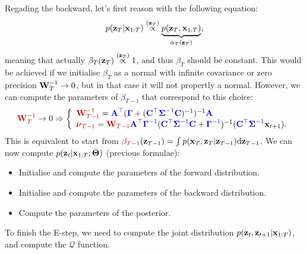  \noindent Regading the backward, let's first reason with the following equation:
 \begin{equation}
  p(\boldsymbol{\mathbf{z}}_T|\boldsymbol{\mathbf{x}}_{1:T}) \stackrel{(\boldsymbol{\mathbf{z}}_T)}{\propto} \underbrace{p(\boldsymbol{\mathbf{z}}_T,\boldsymbol{\mathbf{x}}_{1:T})}_{\alpha_T(\boldsymbol{\mathbf{z}}_T)},
 \end{equation}
meaning that actually $\beta_T(\boldsymbol{\mathbf{z}}_T)\stackrel{(\boldsymbol{\mathbf{z}}_T)}{\propto} 1$, and thus $\beta_T$ should be constant. This would be achieved if we initialise $\beta_T$ as a normal with infinite covariance or zero precision $\boldsymbol{\mathbf{W}}_T^{-1}\rightarrow 0$, but in that case it will not propertly a normal. However, we can compute the parameters of $\beta_{T-1}$ that correspond to this choice:
\begin{equation*}
  \paint{myred}{\bs{W}_T^{-1}}\rightarrow 0 \Rightarrow \left\{\begin{array}{l}
  \paint{myred}{\bs{W}_{T-1}^{-1}} = \paint{myblue}{\bs{A}^\top}(\paint{myblue}{\bs{\Gamma}} + (\paint{myblue}{\bs{C}^\top}\paint{myblue}{\bs{\Sigma}^{-1}}\paint{myblue}{\bs{C}})^{-1})^{-1}\paint{myblue}{\bs{A}} \\
  \paint{myred}{\boldsymbol{\nu}_{T-1}} = \paint{myred}{\bs{W}_{T-1}} \paint{myblue}{\bs{A}^\top}\paint{myblue}{\bs{\Gamma}^{-1}}(\paint{myblue}{\bs{C}^\top}\paint{myblue}{\bs{\Sigma}^{-1}}\paint{myblue}{\bs{C}} + \paint{myblue}{\bs{\Gamma}^{-1}})^{-1} (\paint{myblue}{\bs{C}^\top}\paint{myblue}{\bs{\Sigma}^{-1}}\bs{x}_{t+1}).
  \end{array}\right.
\end{equation*}
 This is equivalent to start from $\paint{myred}{\beta_{T-1}}(\bs{z}_{T-1}) = \int p(\bs{x}_T,\bs{z}_T|\bs{z}_{T-1})\textrm{d}\bs{z}_{T-1}$. We can now compute $p(\boldsymbol{\mathbf{z}}_t|\boldsymbol{\mathbf{x}}_{1:T};\bar{\boldsymbol{\mathbf{\Theta}}})$ (previous formulae):
\begin{itemize}
\item Initialise and compute the parameters of the forward distribution.
\item Initialise and compute the parameters of the backward distribution.
\item Compute the parameters of the posterior.
\end{itemize}
To finish the E-step, we need to compute the joint distribution $p(\boldsymbol{\mathbf{z}}_t,\boldsymbol{\mathbf{z}}_{t+1}|\boldsymbol{\mathbf{x}}_{1:T})$, and compute the $\mathcal{Q}$ function.

